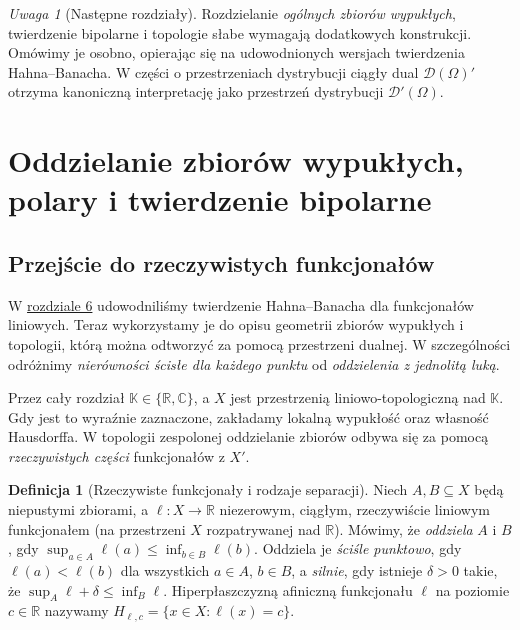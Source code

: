\documentclass[11pt,a4paper]{article}
\numberwithin{equation}{section}
\theoremstyle{plain}
\theoremstyle{definition}
\newtheorem{definicja}[twierdzenie]{Definicja}
\theoremstyle{remark}
\newtheorem{uwaga}[twierdzenie]{Uwaga}
\newcommand{\R}{\mathbb R}
\newcommand{\C}{\mathbb C}
\newcommand{\K}{\mathbb K}
\begin{document}
\begin{uwaga}[Następne rozdziały]
Rozdzielanie \emph{ogólnych zbiorów wypukłych}, twierdzenie
bipolarne i topologie słabe wymagają dodatkowych konstrukcji.
Omówimy je osobno, opierając się na udowodnionych
wersjach twierdzenia Hahna--Banacha. W części o przestrzeniach
dystrybucji ciągły dual $\mathcal D(\Omega)'$ otrzyma
kanoniczną interpretację jako przestrzeń dystrybucji
$\mathcal D'(\Omega)$.
\end{uwaga}


\setcounter{section}{6}
\section{Oddzielanie zbiorów wypukłych, polary i twierdzenie bipolarne}\label{sec:separacja-bipolarne}

\subsection{Przejście do rzeczywistych funkcjonałów}

W \hyperref[sec:hahn-banach]{rozdziale 6} udowodniliśmy twierdzenie Hahna--Banacha dla funkcjonałów liniowych.
Teraz wykorzystamy je do opisu geometrii zbiorów wypukłych i topologii,
którą można odtworzyć za pomocą przestrzeni dualnej. W szczególności odróżnimy
\emph{nierówności ścisłe dla każdego punktu} od \emph{oddzielenia z jednolitą luką}.

Przez cały rozdział $\K\in\{\R,\C\}$, a $X$ jest przestrzenią liniowo-topologiczną
nad $\K$. Gdy jest to wyraźnie zaznaczone, zakładamy lokalną wypukłość
oraz własność Hausdorffa. W topologii zespolonej oddzielanie zbiorów
odbywa się za pomocą \emph{rzeczywistych części} funkcjonałów z $X'$.

\begin{definicja}[Rzeczywiste funkcjonały i rodzaje separacji]\label{def:separacja}
Niech $A,B\subseteq X$ będą niepustymi zbiorami, a
$\ell:X\to\R$ niezerowym, ciągłym, rzeczywiście liniowym funkcjonałem
(na przestrzeni $X$ rozpatrywanej nad $\R$). Mówimy, że
\emph{oddziela} $A$ i $B$, gdy
$\sup_{a\in A}\ell(a)\le\inf_{b\in B}\ell(b)$.
Oddziela je \emph{ściśle punktowo}, gdy $\ell(a)<\ell(b)$
dla wszystkich $a\in A$, $b\in B$, a \emph{silnie}, gdy istnieje
$\delta>0$ takie, że $\sup_A\ell+\delta\le\inf_B\ell$.
Hiperpłaszczyzną afiniczną funkcjonału $\ell$ na poziomie $c\in\R$
nazywamy $H_{\ell,c}=\{x\in X:\ell(x)=c\}$.
\end{definicja}
\end{document}
